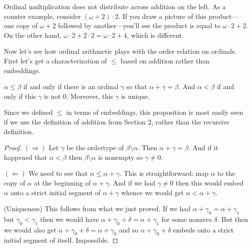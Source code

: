 \documentclass[10pt]{amsart}
\begin{document}
\begin{remark}
Ordinal multiplication does not distribute across addition on the left. As a counter example, consider $(\omega + 2) \cdot 2$. If you draw a picture of this product---one copy of $\omega + 2$ followed by another---you'll see the product is equal to $\omega \cdot 2 + 2$. On the other hand, $\omega \cdot 2 + 2 \cdot 2 = \omega \cdot 2 + 4$, which is different.
\end{remark}



Now let's see how ordinal arithmetic plays with the order relation on ordinals. First let's get a characterization of $\le$ based on addition rather than embeddings.

\begin{proposition}
$\alpha \le \beta$ if and only if there is an ordinal $\gamma$ so that $\alpha + \gamma = \beta$. And $\alpha < \beta$ if and only if this $\gamma$ is not $0$. Moreover, this $\gamma$ is unique.
\end{proposition}

Since we defined $\le$ in terms of embeddings, this proposition is most easily seen if we use the definition of addition from Section 2, rather than the recursive definition.

\begin{proof}
$(\Rightarrow)$ Let $\gamma$ be the ordertype of $\beta \setminus \alpha$. Then $\alpha + \gamma = \beta$. And if it happened that $\alpha < \beta$ then $\beta \setminus \alpha$ is nonempty so $\gamma \ne 0$.

$(\Leftarrow)$ We need to see that $\alpha \le \alpha + \gamma$. This is straightforward: map $\alpha$ to the copy of $\alpha$ at the beginning of $\alpha + \gamma$. And if we had $\gamma \ne 0$ then this would embed $\alpha$ onto a strict initial segment of $\alpha + \gamma$ whence we would get $\alpha < \alpha + \gamma$.

(Uniqueness) This follows from what we just proved. If we had $\alpha + \gamma_0 = \alpha + \gamma_1$ but $\gamma_0 < \gamma_1$ then we would have $\alpha + \gamma_0 + \delta = \alpha + \gamma_1$ for some nonzero $\delta$. But then we would also get $\alpha + \gamma_0 + \delta = \alpha + \gamma_0$ and so $\alpha + \gamma_0 + \delta$ embeds onto a strict initial segment of itself. Impossible.
\end{proof}
\end{document}

